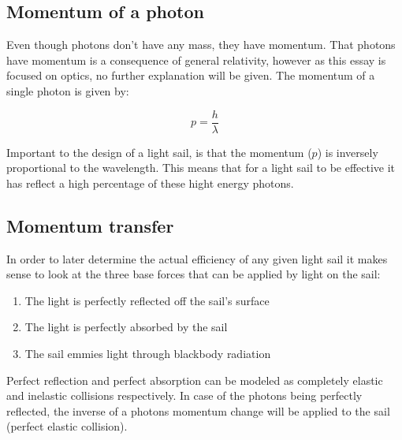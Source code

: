 \documentclass[14pt]{article}
\begin{document}
\subsection{Momentum of a photon}

Even though photons don't have any mass, they have momentum. That photons have momentum is a consequence of general relativity\autocite{openstax},
however as this essay is focused on optics, no further explanation will be given. The momentum of a single photon is given by:

\begin{equation}
  p = \frac{h}{\lambda}
  \label{eq:light_momentum}
\end{equation}

Important to the design of a light sail, is that the momentum ($p$) is inversely proportional to the wavelength. This means that for a light
sail to be effective it has reflect a high percentage of these hight energy photons.

\subsection{Momentum transfer}

In order to later determine the actual efficiency of any given light sail it makes sense to look at the three base forces that can
be applied by light on the sail:

\begin{enumerate}
  \item The light is perfectly reflected off the sail's surface
  \item The light is perfectly absorbed by the sail
  \item The sail emmies light through blackbody radiation
\end{enumerate}

Perfect reflection and perfect absorption can be modeled as completely elastic and inelastic collisions respectively\autocite{paschotta}.
In case of the photons being perfectly reflected, the inverse of a photons momentum change will be applied to the sail
(perfect elastic collision).
\end{document}
